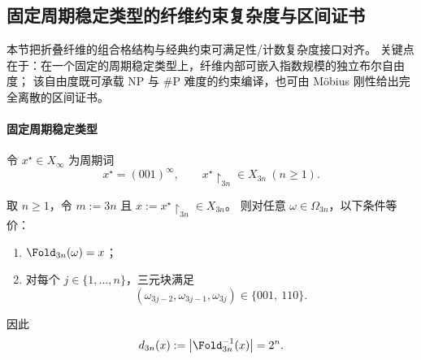 \subsection{固定周期稳定类型的纤维约束复杂度与区间证书}\label{subsec:conclusion-periodic-fiber-cnf-complexity}
本节把折叠纤维的组合格结构与经典约束可满足性/计数复杂度接口对齐。
关键点在于：在一个固定的周期稳定类型上，纤维内部可嵌入指数规模的独立布尔自由度；
该自由度既可承载 \(\mathrm{NP}\) 与 \(\#\mathrm{P}\) 难度的约束编译，也可由 Möbius 刚性给出完全离散的区间证书。

\paragraph{固定周期稳定类型}
令 \(x^\star\in X_\infty\) 为周期词
\[
x^\star=(001)^\infty,
\qquad
x^\star\!\upharpoonright_{3n}\in X_{3n}\ (n\ge 1).
\]

\begin{theorem}[周期三稳定类型的纤维完全刻画与精确多重度]\label{thm:conclusion-period3-fiber-exact-multiplicity}
取 \(n\ge 1\)，令 \(m:=3n\) 且 \(x:=x^\star\!\upharpoonright_{3n}\in X_{3n}\)。
则对任意 \(\omega\in\Omega_{3n}\)，以下条件等价：
\begin{enumerate}
  \item \(\Fold_{3n}(\omega)=x\)；
  \item 对每个 \(j\in\{1,\dots,n\}\)，三元块满足
  \[
  (\omega_{3j-2},\omega_{3j-1},\omega_{3j})\in\{001,\ 110\}.
  \]
\end{enumerate}
因此
\[
d_{3n}(x):=\bigl|\Fold_{3n}^{-1}(x)\bigr|=2^n.
\]
\end{theorem}

